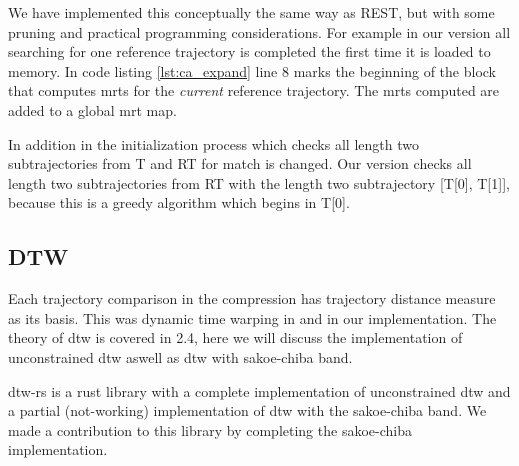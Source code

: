 We have implemented this conceptually the same way as REST, but with some pruning and practical programming considerations.
For example in our version all searching for one reference trajectory is completed the first time it is loaded to memory. In code listing \ref{lst:ca_expand} line 8 marks the beginning of the block that computes \acrshort{mrt}s for the \textit{current} reference trajectory. The \acrshort{mrt}s computed are added to a global \acrshort{mrt} map.

In addition in the initialization process which checks all length two subtrajectories from T and RT for match is changed. Our version checks all length two subtrajectories from RT with the length two subtrajectory [T[0], T[1]], because this is a greedy algorithm which begins in T[0].



\subsection{DTW}
Each trajectory comparison in the compression has trajectory distance measure as its basis. This was dynamic time warping in \cite{zhao2018rest} and in our implementation. The theory of dtw is covered in 2.4, here we will discuss the implementation of unconstrained dtw aswell as dtw with sakoe-chiba band.

dtw-rs is a rust library with a complete implementation of unconstrained dtw and a partial (not-working) implementation of dtw with the sakoe-chiba band. We made a contribution to this library by completing the sakoe-chiba implementation.